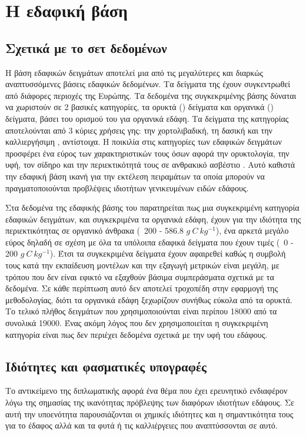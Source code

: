 \chapter{Η εδαφική βάση  }
\label{ch:lucas_soil}

\section{Σχετικά με το σετ δεδομένων}
Η βάση εδαφικών δειγμάτων  αποτελεί μια από τις μεγαλύτερες και διαρκώς αναπτυσσόμενες βάσεις εδαφικών δεδομένων. Τα δείγματα της έχουν συγκεντρωθεί από διάφορες περιοχές της Ευρώπης. 
Τα δεδομένα της συγκεκριμένης βάσης δύναται να χωριστούν σε 2 βασικές κατηγορίες, τα ορυκτά () δείγματα και οργανικά () δείγματα, βάσει του ορισμού του  για οργανικά εδάφη. Τα δείγματα της κατηγορίας  αποτελούνται από 3 κύριες χρήσεις γης: την χορτολιβαδική, τη δασική και την καλλιεργήσιμη , αντίστοιχα. Η ποικιλία στις κατηγορίες των εδαφικών δειγμάτων προσφέρει ένα εύρος των χαρακτηριστικών τους όσων αφορά την ορυκτολογία, την υφή, τον σίδηρο και την περιεκτικότητά τους σε ανθρακικό ασβέστιο \cite{nocita_lucas_soil}. Αυτό καθιστά την εδαφική βάση ικανή για την εκτέλεση πειραμάτων τα οποία μπορούν να πραγματοποιούνται προβλέψεις ιδιοτήτων γενικευμένων ειδών εδάφους.

Στα δεδομένα της εδαφικής βάσης του  παρατηρείται πως μια συγκεκριμένη κατηγορία εδαφικών δειγμάτων, και συγκεκριμένα τα οργανικά εδάφη, έχουν για την ιδιότητα της περιεκτικότητας σε οργανικό άνθρακα (~200 - 586.8 $g~C~kg^{-1}$), ένα αρκετά μεγάλο εύρος δηλαδή σε σχέση με όλα τα υπόλοιπα εδαφικά δείγματα που έχουν τιμές (~0 - 200 $g~C~kg^{-1}$). Έτσι τα συγκεκριμένα δείγματα έχουν αφαιρεθεί καθώς η συμβολή τους κατά την εκπαίδευση μοντέλων και την εξαγωγή μετρικών είναι μεγάλη, με τρόπου που δεν είναι εφικτό να εξαχθούν βάσιμα συμπεράσματα σχετικά με τα δεδομένα. Σε κάθε περίπτωση αυτό δεν αποτελεί τροχοπέδη στην εφαρμογή της μεθοδολογίας, διότι τα οργανικά εδάφη ξεχωρίζουν συνήθως εύκολα από τα ορυκτά. Το τελικό πλήθος δειγμάτων που χρησιμοποιούνται είναι περίπου 18000 από τα συνολικά 19000. Ένας ακόμη λόγος που δεν χρησιμοποιείται η συγκεκριμένη κατηγορία είναι πως δεν περιέχει δεδομένα σχετικά με την υφή του εδάφους.

\section{Ιδιότητες και φασματικές υπογραφές}
Το αντικείμενο της διπλωματικής αφορά ένα θέμα που έχει ερευνητικό ενδιαφέρον λόγω της σημασίας της ικανότητας πρόβλεψης των διαφόρων ιδιοτήτων εδάφους. Σε αυτή την υποενότητα παρουσιάζονται οι χημικές ιδιότητες και η σημαντικότητα τους για το έδαφος αλλά και τα φυτά ή τις καλλιέργειες που αναπτύσσονται σε αυτό.

